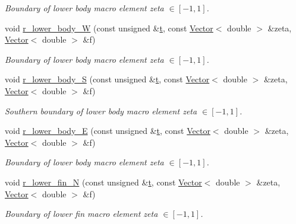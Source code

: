 \begin{DoxyCompactItemize}
\begin{DoxyCompactList}\small\item\em Boundary of lower body macro element zeta $ \in [-1,1] $. \end{DoxyCompactList}\item 
void \hyperlink{classoomph_1_1FishDomain_a4466e68eb38c1e931743db93af2e9ba9}{r\+\_\+lower\+\_\+body\+\_\+W} (const unsigned \&\hyperlink{cfortran_8h_af6f0bd3dc13317f895c91323c25c2b8f}{t}, const \hyperlink{classoomph_1_1Vector}{Vector}$<$ double $>$ \&zeta, \hyperlink{classoomph_1_1Vector}{Vector}$<$ double $>$ \&f)
\begin{DoxyCompactList}\small\item\em Boundary of lower body macro element zeta $ \in [-1,1] $. \end{DoxyCompactList}\item 
void \hyperlink{classoomph_1_1FishDomain_aa33b19ceef5cd574ee0a6756bcfc6da7}{r\+\_\+lower\+\_\+body\+\_\+S} (const unsigned \&\hyperlink{cfortran_8h_af6f0bd3dc13317f895c91323c25c2b8f}{t}, const \hyperlink{classoomph_1_1Vector}{Vector}$<$ double $>$ \&zeta, \hyperlink{classoomph_1_1Vector}{Vector}$<$ double $>$ \&f)
\begin{DoxyCompactList}\small\item\em Southern boundary of lower body macro element zeta $\in [-1,1] $. \end{DoxyCompactList}\item 
void \hyperlink{classoomph_1_1FishDomain_abb85a2acd9cf3cd8fae60fd9e487bd1c}{r\+\_\+lower\+\_\+body\+\_\+E} (const unsigned \&\hyperlink{cfortran_8h_af6f0bd3dc13317f895c91323c25c2b8f}{t}, const \hyperlink{classoomph_1_1Vector}{Vector}$<$ double $>$ \&zeta, \hyperlink{classoomph_1_1Vector}{Vector}$<$ double $>$ \&f)
\begin{DoxyCompactList}\small\item\em Boundary of lower body macro element zeta $ \in [-1,1] $. \end{DoxyCompactList}\item 
void \hyperlink{classoomph_1_1FishDomain_a6d45dba13043b2b6df831848da665f21}{r\+\_\+lower\+\_\+fin\+\_\+N} (const unsigned \&\hyperlink{cfortran_8h_af6f0bd3dc13317f895c91323c25c2b8f}{t}, const \hyperlink{classoomph_1_1Vector}{Vector}$<$ double $>$ \&zeta, \hyperlink{classoomph_1_1Vector}{Vector}$<$ double $>$ \&f)
\begin{DoxyCompactList}\small\item\em Boundary of lower fin macro element zeta $ \in [-1,1] $. \end{DoxyCompactList}\item 

\end{DoxyCompactItemize}
